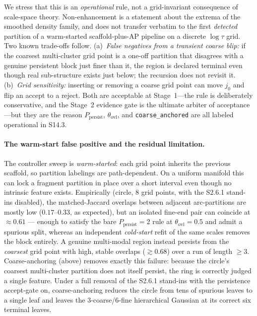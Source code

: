 \documentclass[11pt]{article}
\begin{document}
We stress that this is an \emph{operational} rule, not a grid-invariant
consequence of scale-space theory. Non-enhancement is a statement about the
extrema of the smoothed density family, and does not transfer verbatim to the
first \emph{detected} partition of a warm-started scaffold-plus-AP pipeline on a
discrete $\log\tau$ grid. Two known trade-offs follow. (a)~\emph{False negatives
from a transient coarse blip:} if the coarsest multi-cluster grid point is a
one-off partition that disagrees with a genuine persistent block just finer than
it, the region is declared terminal even though real sub-structure exists just
below; the recursion does not revisit it. (b)~\emph{Grid sensitivity:} inserting
or removing a coarse grid point can move $j_0$ and flip an accept to a reject.
Both are acceptable at Stage~1---the rule is deliberately conservative, and the
Stage~2 evidence gate is the ultimate arbiter of acceptance---but they are the
reason $P_{\mathrm{persist}}$, $\theta_{\mathrm{ovl}}$, and
\texttt{coarse\_anchored} are all labeled operational in S14.3.

\paragraph{The warm-start false positive and the residual limitation.}
The controller sweep is \emph{warm-started}: each grid point inherits the
previous scaffold, so partition labelings are path-dependent. On a uniform
manifold this can lock a fragment partition in place over a short interval even
though no intrinsic feature exists. Empirically (circle, $8$ grid points, with
the S2.6.1 stand-ins disabled), the matched-Jaccard overlaps between adjacent
arc-partitions are mostly low ($0.17$--$0.33$, as expected), but an isolated
fine-end pair can coincide at $\approx0.61$ --- enough to satisfy the bare
$P_{\mathrm{persist}}=2$ rule at $\theta_{\mathrm{ovl}}=0.5$ and admit a spurious
split, whereas an independent \emph{cold-start} refit of the same scales removes
the block entirely. A genuine multi-modal region instead persists from the
\emph{coarsest} grid point with high, stable overlaps ($\gtrsim0.68$) over a run
of length $\ge3$. Coarse-anchoring (above) removes exactly this failure: because
the circle's coarsest multi-cluster partition does not itself persist, the ring
is correctly judged a single feature. Under a full removal of the S2.6.1
stand-ins with the persistence accept-gate on, coarse-anchoring reduces the
circle from tens of spurious leaves to a single leaf and leaves the
$3$-coarse/$6$-fine hierarchical Gaussian at its correct six terminal leaves.
\end{document}
